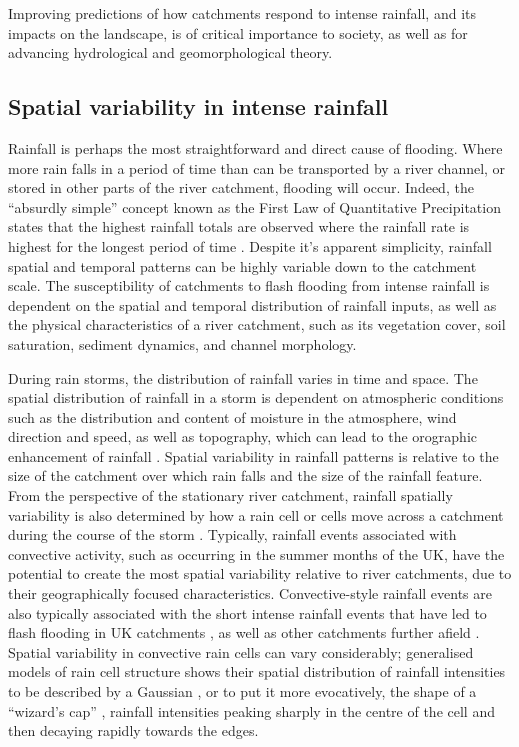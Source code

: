 Improving predictions of how catchments respond to intense rainfall, and its impacts on the landscape, is of critical importance to society, as well as for advancing hydrological and geomorphological theory.

\subsection{Spatial variability in intense rainfall}
Rainfall is perhaps the most straightforward and direct cause of flooding. Where more rain falls in a period of time than can be transported  by a river channel, or stored in other parts of the river catchment, flooding will occur. Indeed, the ``absurdly simple'' concept known as the First Law of Quantitative Precipitation states that the highest rainfall totals are observed where the rainfall rate is highest for the longest period of time \citep{Doswell1996}. Despite it's apparent simplicity, rainfall spatial and temporal patterns can be highly variable down to the catchment scale. The susceptibility of catchments to flash flooding from intense rainfall is dependent on the spatial and temporal distribution of rainfall inputs, as well as the physical characteristics of a river catchment, such as its vegetation cover, soil saturation, sediment dynamics, and channel morphology.

During rain storms, the distribution of rainfall varies in time and space. The spatial distribution of rainfall in a storm is dependent on atmospheric conditions such as the distribution and content of moisture in the atmosphere, wind direction and speed, as well as topography, which can lead to the orographic enhancement of rainfall \citep{Roe2003,Roe2005a,Houze2012}. Spatial variability in rainfall patterns is relative to the size of the catchment over which rain falls and the size of the rainfall feature. From the perspective of the stationary river catchment, rainfall spatially variability is also determined by how a rain cell or cells move across a  catchment during the course of the storm \citep{willems2001spatial}. Typically, rainfall events associated with convective activity, such as occurring in the summer months of the UK, have the potential to create the most spatial variability relative to river catchments, due to their geographically focused characteristics. Convective-style rainfall events are also typically associated with the short intense rainfall events that have led to flash flooding in UK catchments \citep{gray1998mesoscale,bell2000sensitivity,Browning2007,blackburn2008large,Kendon2014}, as well as other catchments further afield \citep{doswell1993flash,Doswell1996}. Spatial variability in convective rain cells can vary considerably; generalised models of rain cell structure shows their spatial distribution of rainfall intensities to be described by a Gaussian \citep{luyckx1998influence,willems2001spatial}, or to put it more evocatively, the shape of a ``wizard's cap'' \citep{solyom2007importance}, rainfall intensities peaking sharply in the centre of the cell and then decaying rapidly towards the edges.
 
